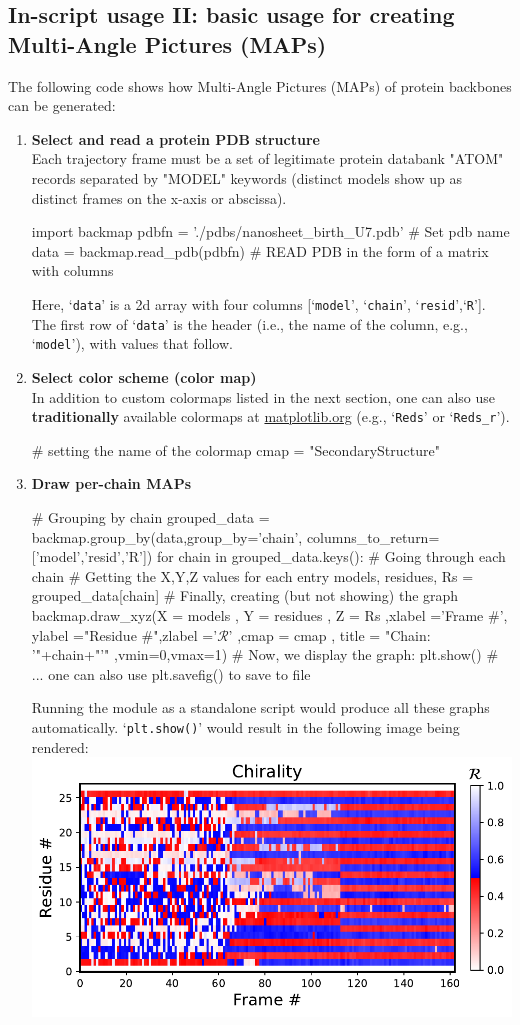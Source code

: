 \documentclass[fleqn,10pt,lineno]{wlpeerj} %
\def\ContinueLineNumber{\lstset{firstnumber=last}}
\newcommand{\n}[1]{{\textbf{\color{red}#1}}}
\newcommand{\code}[1]{\texttt{#1}\xspace}
\begin{document}
\subsection*{In-script usage II: basic usage for creating Multi-Angle Pictures (MAPs)}
The following code shows how Multi-Angle Pictures (MAPs) of protein backbones can be generated:
\begin{enumerate}
\item {\bf Select and read a protein PDB structure}\\
Each trajectory frame must be a set of legitimate protein databank "ATOM" records separated by "MODEL" keywords (distinct models show up as distinct frames on the x-axis or abscissa).
\begin{python}[firstnumber=1]
import backmap 
pdbfn = './pdbs/nanosheet_birth_U7.pdb' # Set pdb name 
data = backmap.read_pdb(pdbfn) # READ PDB in the form of a matrix with columns
\end{python}
Here, `\code{data}' is a 2d array with four columns [`\code{model}', `\code{chain}', `\code{resid}',`\code{R}']. 
The first row of `\code{data}' is the header (i.e., the name of the column, e.g., `\code{model}'), 
with values that follow.
\item {\bf Select color scheme (color map)}\\
In addition to custom colormaps listed in the next section, one can also use \n{traditionally} available colormaps at 
\href{http://matplotlib.org/examples/color/colormaps_reference.htm}{matplotlib.org} (e.g., `\code{Reds}' or `\code{Reds\_r}').
\ContinueLineNumber
\begin{python}
# setting the name of the colormap
cmap = "SecondaryStructure"
\end{python}
\item {\bf Draw per-chain MAPs}
\ContinueLineNumber
\begin{python}
# Grouping by chain
grouped_data = backmap.group_by(data,group_by='chain',
                            columns_to_return=['model','resid','R'])
for chain in grouped_data.keys(): # Going through each chain
	# Getting the X,Y,Z values for each entry
	models, residues, Rs = grouped_data[chain]
	# Finally, creating (but not showing) the graph 
	backmap.draw_xyz(X = models  ,      Y = residues  ,     Z = Rs
	           ,xlabel ='Frame #', ylabel ="Residue #",zlabel ='$\mathcal{R}$'
	             ,cmap = cmap    ,  title = "Chain: '"+chain+"'"
	             ,vmin=0,vmax=1)
	# Now, we display the graph:
	plt.show() # ... one can also use plt.savefig() to save to file
\end{python}
Running the module as a standalone script would produce all these graphs automatically.
`\code{plt.show()}' would result in the following image being rendered:\\
\includegraphics[width=0.5\linewidth]{automated_figures/example.pdf}


\end{enumerate}
\end{document}
